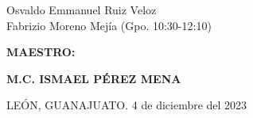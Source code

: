 \begin{titlepage}
\begin{minipage}{180mm}
{{{				Osvaldo Emmanuel Ruiz Veloz\\
				Fabrizio Moreno Mejía}} (Gpo. 10:30-12:10)
				\par
		}
		\vspace{10mm}
		{\fontsize{14}{18pt}\selectfont{}
			\textbf{
				MAESTRO:
			}\par
		}
		\vspace{5mm}
		{\fontsize{12}{16pt}\selectfont{}
			\textbf{
				M.C. ISMAEL PÉREZ MENA
			}\par
		}
		\vspace{12mm}
		{\fontsize{10}{14pt}\selectfont{}
			LEÓN, GUANAJUATO. \hspace{70mm} 4 de diciembre del 2023\par
		}
	\end{minipage}
\end{titlepage}
\restoregeometry